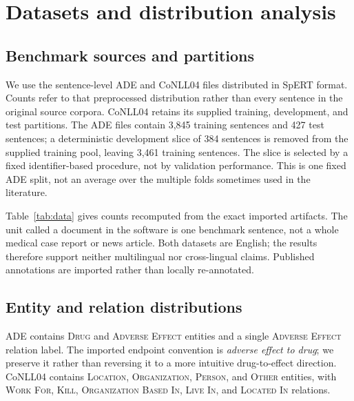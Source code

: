 \documentclass[preprint,12pt]{elsarticle}
\begin{document}
\section{Datasets and distribution analysis}
\label{sec:data}
\subsection{Benchmark sources and partitions}
We use the sentence-level ADE and CoNLL04 files distributed in SpERT format.
Counts refer to that preprocessed distribution rather than every sentence in
the original source corpora.
CoNLL04 retains its supplied training, development, and test partitions. The
ADE files contain 3,845 training sentences and 427 test sentences; a
deterministic development slice of 384 sentences is removed from the supplied
training pool, leaving 3,461 training sentences. The slice is selected by a
fixed identifier-based procedure, not by validation performance. This is one
fixed ADE split, not an average over the multiple folds sometimes used in the
literature.

Table~\ref{tab:data} gives counts recomputed from the exact imported artifacts.
The unit called a document in the software is one benchmark sentence, not a
whole medical case report or news article. Both datasets are English; the
results therefore support neither multilingual nor cross-lingual claims.
Published annotations are imported rather than locally re-annotated.

\begin{table}[htbp]
\centering\small\setlength{\tabcolsep}{4pt}
\caption{Dataset inventory for the exact experimental partitions. Length is
the number of whitespace-delimited tokens in the reconstructed source text.}
\label{tab:data}

\end{table}

\subsection{Entity and relation distributions}
ADE contains \textsc{Drug} and \textsc{Adverse Effect} entities and a single
\textsc{Adverse Effect} relation label. The imported endpoint convention is
\emph{adverse effect to drug}; we preserve it rather than reversing it to a
more intuitive drug-to-effect direction. CoNLL04 contains \textsc{Location},
\textsc{Organization}, \textsc{Person}, and \textsc{Other} entities, with
\textsc{Work For}, \textsc{Kill}, \textsc{Organization Based In},
\textsc{Live In}, and \textsc{Located In} relations.
\end{document}
